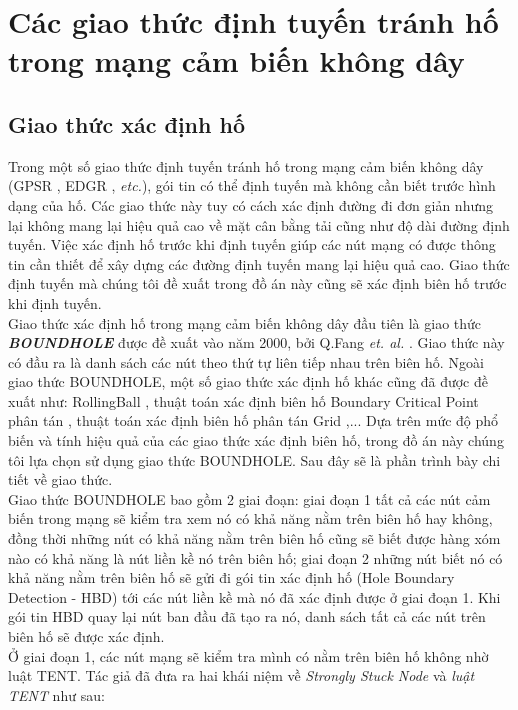 \documentclass[12pt]{report}
\begin{document}
\chapter{Các giao thức định tuyến tránh hố trong mạng cảm biến không dây}
\label{sec:2}

\section{Giao thức xác định hố}
\label{sec:2.1}
Trong một số giao thức định tuyến tránh hố trong mạng cảm biến không dây (GPSR \cite{gpsr}, EDGR \cite{edgr}, \textit{etc.}), gói tin có thể định tuyến mà không cần biết trước hình dạng của hố. Các giao thức này tuy có cách xác định đường đi đơn giản nhưng lại không mang lại hiệu quả cao về mặt cân bằng tải cũng như độ dài đường định tuyến. Việc xác định hố trước khi định tuyến giúp các nút mạng có được thông tin cần thiết để xây dựng các đường định tuyến mang lại hiệu quả cao. Giao thức định tuyến mà chúng tôi đề xuất trong đồ án này cũng sẽ xác định biên hố trước khi định tuyến.\\
Giao thức xác định hố trong mạng cảm biến không dây đầu tiên là giao thức  \textit{\textbf{BOUNDHOLE}} được đề xuất vào năm 2000, bởi Q.Fang \textit{et. al.} \cite{boundhole}. Giao thức này có đầu ra là danh sách các nút theo thứ tự liên tiếp nhau trên biên hố. Ngoài giao thức BOUNDHOLE, một số giao thức xác định hố khác cũng đã được đề xuất như: RollingBall \cite{rollingball}, thuật toán xác định biên hố Boundary Critical Point phân tán \cite{bcp}, thuật toán xác định biên hố phân tán Grid \cite{grid},... Dựa trên mức độ phổ biến và tính hiệu quả của các giao thức xác định biên hố, trong đồ án này chúng tôi lựa chọn sử dụng giao thức BOUNDHOLE. Sau đây sẽ là phần trình bày chi tiết về giao thức.\\
Giao thức BOUNDHOLE bao gồm 2 giai đoạn: giai đoạn 1 tất cả các nút cảm biến trong mạng sẽ kiểm tra xem nó có khả năng nằm trên biên hố hay không, đồng thời những nút có khả năng nằm trên biên hố cũng sẽ biết được hàng xóm nào có khả năng là nút liền kề nó trên biên hố; giai đoạn 2 những nút biết nó có khả năng nằm trên biên hố sẽ gửi đi gói tin xác định hố (Hole Boundary Detection - HBD) tới các nút liền kề mà nó đã xác định được ở giai đoạn 1. Khi gói tin HBD quay lại nút ban đầu đã tạo ra nó, danh sách tất cả các nút trên biên hố sẽ được xác định.\\
Ở giai đoạn 1, các nút mạng sẽ kiểm tra mình có nằm trên biên hố không nhờ luật TENT. Tác giả đã đưa ra hai khái niệm về \textit{Strongly Stuck Node} và \textit{luật TENT} như sau:
\end{document}
